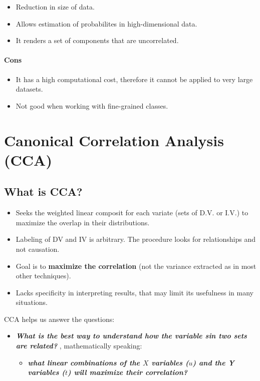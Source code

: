 \documentclass[]{book}
\providecommand{\tightlist}{%
  \setlength{\itemsep}{0pt}\setlength{\parskip}{0pt}}
\begin{document}
\begin{itemize}
\tightlist
\item
  Reduction in size of data.
\item
  Allows estimation of probabilites in high-dimensional data.
\item
  It renders a set of components that are uncorrelated.
\end{itemize}

\subsubsection{\texorpdfstring{\textbf{Cons}}{Cons}}\label{cons}

\begin{itemize}
\tightlist
\item
  It has a high computational cost, therefore it cannot be applied to
  very large datasets.
\item
  Not good when working with fine-grained classes.
\end{itemize}

\chapter{Canonical Correlation Analysis
(CCA)}\label{canonical-correlation-analysis-cca}

\section{What is CCA?}\label{what-is-cca}

\begin{itemize}
\tightlist
\item
  Seeks the weighted linear composit for each variate (sets of D.V. or
  I.V.) to maximize the overlap in their distributions.
\item
  Labeling of DV and IV is arbitrary. The procedure looks for
  relationships and not causation.
\item
  Goal is to \textbf{maximize the correlation} (not the variance
  extracted as in most other techniques).
\item
  Lacks specificity in interpreting results, that may limit its
  usefulness in many situations.
\end{itemize}

CCA helps us answer the questions:

\begin{itemize}
\tightlist
\item
  \textbf{\emph{What is the best way to understand how the variable sin
  two sets are related? }}, mathematically speaking:

  \begin{itemize}
  \tightlist
  \item
    \textbf{\emph{what linear combinations of the \(X\) variables
    (\(u\)) and the Y variables (\(t\)) will maximize their
    correlation?}}
  \end{itemize}
\end{itemize}
\end{document}
